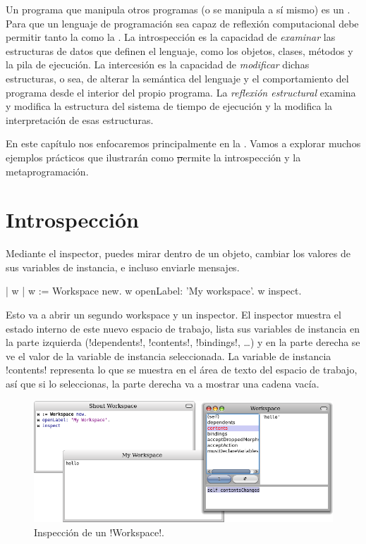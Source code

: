 \documentclass[a4paper,10pt,twoside]{book}
\begin{document}
Un programa que manipula otros programas (o se manipula a s\'i mismo) es
un .  Para que un lenguaje de programaci\'on sea
capaz de reflexi\'on computacional debe permitir tanto la
 como la .  La introspecci\'on es la
capacidad de \emph{examinar} las estructuras de datos que definen el
lenguaje, como los objetos, clases, m\'etodos y la pila de ejecuci\'on.
La intercesi\'on es la capacidad de \emph{modificar} dichas estructuras,
o sea, de alterar la sem\'antica del lenguaje y el comportamiento del
programa desde el interior del propio programa.  La \emph{reflexi\'on
  estructural} examina y modifica la estructura del sistema de tiempo
de ejecuci\'on y la  modifica la
interpretaci\'on de esas estructuras.

En este cap\'itulo nos enfocaremos principalmente en la . Vamos a explorar muchos ejemplos pr\'acticos que
ilustrar\'an como \st permite la introspecci\'on y la metaprogramaci\'on.

\section{Introspecci\'on}

Mediante el inspector, puedes mirar dentro de un objeto, cambiar los
valores de sus variables de instancia, e incluso enviarle mensajes.

\begin{code}{| w |}
w := Workspace new.
w openLabel: 'My workspace'.
w inspect.
\end{code}

Esto va a abrir un segundo workspace y un inspector.  El inspector
muestra el estado interno de este nuevo espacio de trabajo, lista sus
variables de instancia en la parte izquierda (\ct!dependents!,
\ct!contents!, \ct!bindings!, \ldots) y en la parte derecha se ve el
valor de la variable de instancia seleccionada.  La variable de
instancia \ct!contents! representa lo que se muestra en el \'area de
texto del espacio de trabajo, as\'i que si lo seleccionas, la parte
derecha va a mostrar una cadena vac\'ia.

\begin{figure}[ht]\centering
        \includegraphics[width=\linewidth]{workspaceInspector}
        \caption{Inspecci\'on de un \ct!Workspace!.}
\end{figure}
\end{document}
